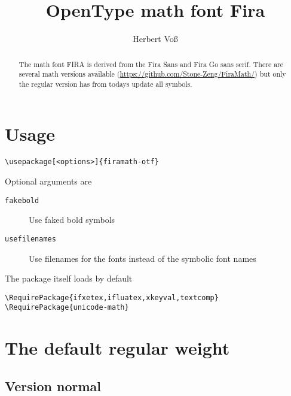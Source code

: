 \documentclass[english,log-declarations=false]{article}
\title{OpenType math font Fira}
\author{Herbert Voß}
\begin{document}
\maketitle

\tableofcontents


\begin{abstract}
The math font FIRA is derived from the Fira Sans and Fira Go sans serif.
There are several math versions available (\url{https://github.com/Stone-Zeng/FiraMath/}) but
only the regular version has from todays update all symbols. 
\end{abstract}


\section{Usage}

\begin{verbatim}
\usepackage[<options>]{firamath-otf}
\end{verbatim}

Optional arguments are 

\begin{description}
\item[\texttt{fakebold}] Use faked bold symbols 
\item[\texttt{usefilenames}] Use filenames for the fonts instead of the symbolic font names
\end{description}


The package itself loads by default

\begin{verbatim}
\RequirePackage{ifxetex,ifluatex,xkeyval,textcomp}
\RequirePackage{unicode-math}
\end{verbatim}




\section{The default regular weight}

\def\Q#1#2{\frac{\uppartial #1}{\uppartial #2}}
\def\half{\frac{1}{2}}
\def\vvec#1{\vv{#1}}
\newcommand\uppartial{\symup{\partial}}
\newcommand*\diff{\mathop{}\!\symup{d}}
\newcommand*\<{\negthickspace}
\newcommand*\TT{\symbf{\symup{T}}}
\def\DD{\symbf{\symup{D}}}



\subsection{Version normal}
\end{document}
